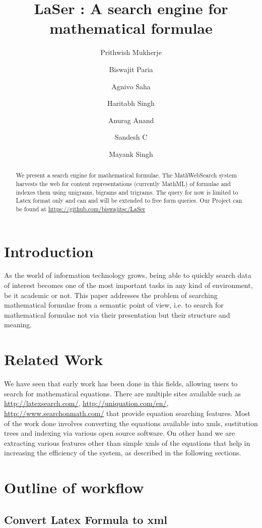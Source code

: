 \documentclass[
journal=jacsat, %
manuscript=article]{achemso}
\author{Prithwish Mukherje}
\author{Biswajit Paria}
\author{Agnivo Saha}
\author{Haritabh Singh}
\author{Anurag Anand}
\author{Sandesh C}
\author{Mayank Singh}
\affiliation[IIT Kharagpur]
{Department of Computer Science, IIT, Kharagpur}
\title[\texttt{achemso} demonstration]
{LaSer : A search engine for mathematical formulae}
\begin{document}
\begin{abstract}
We present a search engine for mathematical formulae. The
MathWebSearch system harvests the web for content representations
(currently MathML) of formulae and indexes them using unigrams, 
bigrams and trigrams. The query for now is limited to Latex format only and can and will be extended to free form queries. Our Project can be found at \url{https://github.com/biswajitsc/LaSer}

\end{abstract}


\section{Introduction}

As the world of information technology grows, being able to quickly
search data of interest becomes one of the most important tasks in
any kind of environment, be it academic or not. This paper addresses
the problem of searching mathematical formulae from a semantic
point of view, i.e. to search for mathematical formulae not via their
presentation but their structure and meaning.


\section{Related Work}

We have seen that early work has been done in this fields, allowing users to search for mathematical equations. 
There are multiple sites available such as \url{http://latexsearch.com/}, \url{http://uniquation.com/en/}, \url{http://www.searchonmath.com/} 
that provide equation searching features. Most of the work done involves converting the equations available into xmls,
sustitution trees and indexing via various open source software. On other hand we are extracting various features other than simple 
xmls of the equations that help in increasing the efficiency of the system, as described in the following sections.

\section{Outline of workflow}

	\subsection{Convert Latex Formula to xml}
	
\end{document}
